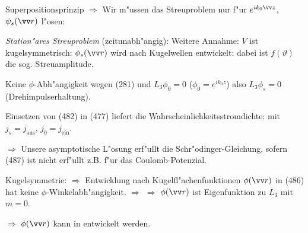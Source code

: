 \documentclass[a4paper]{scrartcl}
\begin{document}
Superpositionsprinzip $\Longrightarrow$ Wir m"ussen das Streuproblem nur f"ur $e^{i k_0 \vv z}$, $\psi_s(\vv r)$ l"osen:

\emph{Station"ares Streuproblem} (zeitunabh"angig):
Weitere Annahme: $V$ ist kugelsymmetrisch:
$\phi_s(\vv r)$ wird nach Kugelwellen entwickelt:
dabei ist $f(\vartheta)$ die sog. Streuamplitude.

Keine $\phi$-Abh"angigkeit wegen (281) und $L_3 \phi_0 = 0$ ($\phi_0 = e^{i k_0 z}$) also $L_3 \phi_s = 0$ (Drehimpulserhaltung).

Einsetzen von (482) in (477) liefert die Wahrscheinlichkeitsstromdichte:
mit $j_s = j_\mathrm{aus}$, $j_0 = j_\mathrm{ein}$.

$\Longrightarrow$
Unsere asymptotische L"osung
erf"ullt die Schr"odinger-Gleichung, sofern
(487) ist nicht erf"ullt z.B. f"ur das Coulomb-Potenzial.

Kugelsymmetrie:
$\Longrightarrow$ Entwicklung nach Kugelfl"achenfunktionen
$\phi(\vv r)$ in (486) hat keine $\phi$-Winkelabh"angigkeit. $\Longrightarrow$
$\Longrightarrow$ $\phi(\vv r)$ ist Eigenfunktion zu $L_3$ mit $m=0$.

$\Longrightarrow$ $\phi(\vv r)$ kann in 
entwickelt werden.
\end{document}
